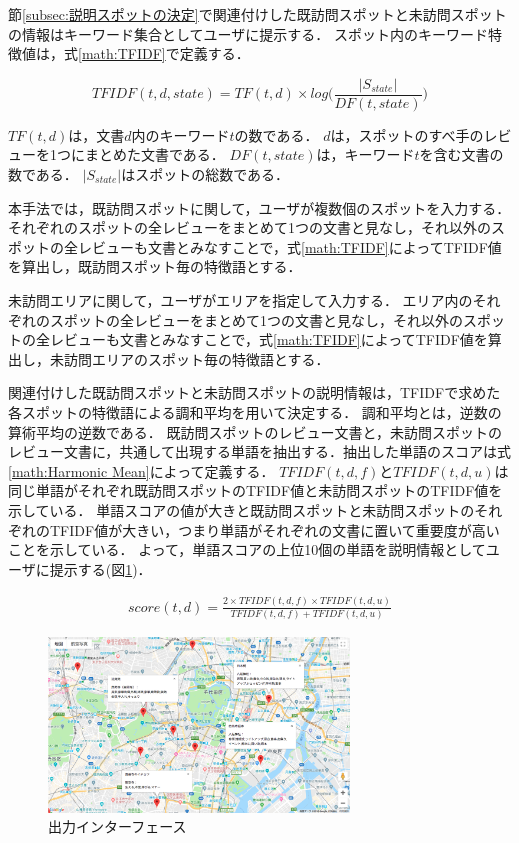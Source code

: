 \documentclass{deimj}
\begin{document}
節\ref{subsec:説明スポットの決定}で関連付けした既訪問スポットと未訪問スポットの情報はキーワード集合としてユーザに提示する．
スポット内のキーワード特徴値は，式\ref{math:TFIDF}で定義する．

\begin{equation}
  TFIDF(t,d,state) = TF(t,d) \times log\Biggr(\frac{|S_{state}|}{DF(t,state)}\Biggr)
  \label{math:TFIDF}
\end{equation}

$TF(t,d)$は，文書$d$内のキーワード$t$の数である．
$d$は，スポットのすべ手のレビューを1つにまとめた文書である．
$DF(t,state)$は，キーワード$t$を含む文書の数である．
$|S_{state}|$はスポットの総数である．

本手法では，既訪問スポットに関して，ユーザが複数個のスポットを入力する．
それぞれのスポットの全レビューをまとめて1つの文書と見なし，それ以外のスポットの全レビューも文書とみなすことで，式\ref{math:TFIDF}によってTFIDF値を算出し，既訪問スポット毎の特徴語とする．

未訪問エリアに関して，ユーザがエリアを指定して入力する．
エリア内のそれぞれのスポットの全レビューをまとめて1つの文書と見なし，それ以外のスポットの全レビューも文書とみなすことで，式\ref{math:TFIDF}によってTFIDF値を算出し，未訪問エリアのスポット毎の特徴語とする．

関連付けした既訪問スポットと未訪問スポットの説明情報は，TFIDFで求めた各スポットの特徴語による調和平均を用いて決定する．
調和平均とは，逆数の算術平均の逆数である．
既訪問スポットのレビュー文書と，未訪問スポットのレビュー文書に，共通して出現する単語を抽出する．抽出した単語のスコアは式\ref{math:Harmonic Mean}によって定義する．
$TFIDF(t,d,f)$と$TFIDF(t,d,u)$は同じ単語がそれぞれ既訪問スポットのTFIDF値と未訪問スポットのTFIDF値を示している．
単語スコアの値が大きと既訪問スポットと未訪問スポットのそれぞれのTFIDF値が大きい，つまり単語がそれぞれの文書に置いて重要度が高いことを示している．
よって，単語スコアの上位10個の単語を説明情報としてユーザに提示する(図\ref{fig:photo_map})．

\begin{eqnarray}
  score(t,d) = \frac{2 \times TFIDF(t,d,f) \times TFIDF(t,d,u)}{TFIDF(t,d,f) + TFIDF(t,d,u)}
  \label{math:Harmonic Mean}
\end{eqnarray}

\begin{figure}[t]
  \begin{center}
    \includegraphics[clip,width=8.0cm]{picture/Photo_Map.png}
    \caption{出力インターフェース}
    \label{fig:photo_map}
   \end{center}
\end{figure}
\end{document}

